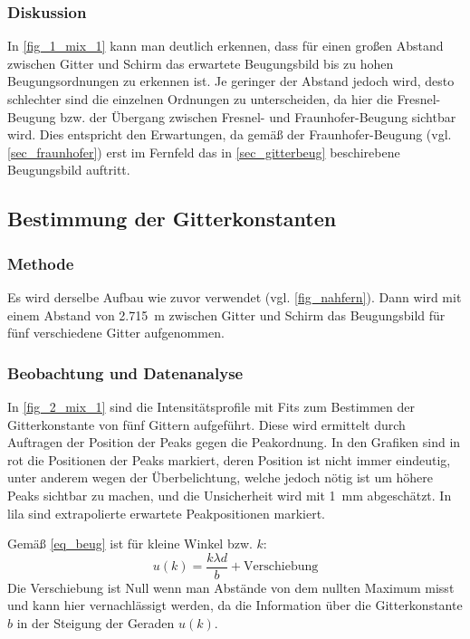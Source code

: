 \documentclass[
	a4paper,
	12pt,
	pagesize,
	ngerman
]{scrartcl}
\begin{document}
	\subsubsection*{Diskussion}
	In \cref{fig_1_mix_1} kann man deutlich erkennen, dass für einen großen Abstand zwischen Gitter und Schirm das erwartete Beugungsbild bis zu hohen Beugungsordnungen zu erkennen ist.
	Je geringer der Abstand jedoch wird, desto schlechter sind die einzelnen Ordnungen zu unterscheiden, da hier die Fresnel-Beugung bzw. der Übergang zwischen Fresnel- und Fraunhofer-Beugung sichtbar wird.
	Dies entspricht den Erwartungen, da gemäß der Fraunhofer-Beugung (vgl. \cref{sec_fraunhofer}) erst im Fernfeld das in \cref{sec_gitterbeug} beschirebene Beugungsbild auftritt.

	\subsection{Bestimmung der Gitterkonstanten} \label{ss_2_beug}

	\subsubsection*{Methode}

	Es wird derselbe Aufbau wie zuvor verwendet (vgl. \cref{fig_nahfern}).
	Dann wird mit einem Abstand von \SI{2,715}{m} zwischen Gitter und Schirm das Beugungsbild für fünf verschiedene Gitter aufgenommen.

	\subsubsection*{Beobachtung und Datenanalyse}
 In \cref{fig_2_mix_1} sind die Intensitätsprofile mit Fits zum Bestimmen der Gitterkonstante von fünf Gittern aufgeführt.
 Diese wird ermittelt durch Auftragen der Position der Peaks gegen die Peakordnung.
 In den Grafiken sind in rot die Positionen der Peaks markiert, deren Position ist nicht immer eindeutig, unter anderem wegen der Überbelichtung, welche jedoch nötig ist um höhere Peaks sichtbar zu machen, und die Unsicherheit wird mit \SI{1}{mm} abgeschätzt.
 In lila sind extrapolierte erwartete Peakpositionen markiert.

 Gemäß \cref{eq_beug} ist für kleine Winkel bzw. $k$:
 \begin{equation}
	 \label{eq_beug_verschieb}
	 u(k) = \frac{k\lambda d}{b} + \text{Verschiebung}
 \end{equation}
 Die Verschiebung ist Null wenn man Abstände von dem nullten Maximum misst und kann hier vernachlässigt werden, da die Information über die Gitterkonstante $b$ in der Steigung der Geraden $u(k)$.
\end{document}
